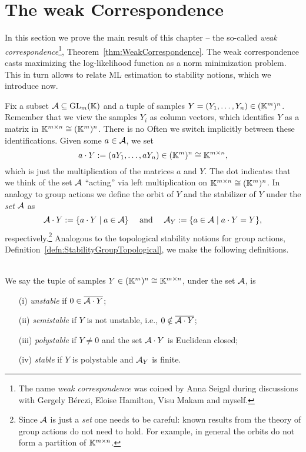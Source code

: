 
\section{The weak Correspondence}\label{sec:WeakCorrespondence}

In this section we prove the main result of this chapter -- the so-called \emph{weak correspondence}\footnote{The name \emph{weak correspondence} was coined by Anna Seigal during discussions with Gergely B\'erczi, Eloise Hamilton, Visu Makam and myself.}, Theorem~\ref{thm:WeakCorrespondence}. The weak correspondence casts maximizing the log-likelihood function as a norm minimization problem. This in turn allows to relate ML estimation to stability notions, which we introduce now.

Fix a subset $\mathcal{A} \subseteq \operatorname{GL}_m(\mathbb K)$ and a tuple of samples $Y = (Y_1, \ldots, Y_n) \in (\mathbb K^m)^n$. Remember that we view the samples $Y_i$ as column vectors, which identifies $Y$ as a matrix in $\mathbb K^{m \times n} \cong (\mathbb K^m)^n$. There is no Often we switch implicitly between these identifications. Given some $a \in \mathcal{A}$, we set
	\[ a \cdot Y := (aY_1, \ldots, aY_n) \in (\mathbb K^m)^n \cong \mathbb K^{m \times n} , \]
which is just the multiplication of the matrices $a$ and $Y$.
The dot indicates that we think of the set $\mathcal{A}$ ``acting'' via left multiplication on $\mathbb K^{m \times n} \cong (\mathbb K^m)^n$. In analogy to group actions we define the orbit of $Y$ and the stabilizer of $Y$ under the \emph{set} $\mathcal{A}$ as
	\begin{equation}\label{eq:defnOrbitStabilizerUnderA}
		\mathcal{A} \cdot Y := \{ a \cdot Y \mid a \in \mathcal{A} \} \quad \text{ and } \quad
		\mathcal{A}_Y := \{a \in \mathcal{A} \mid a \cdot Y = Y\},
	\end{equation}
respectively.\footnote{Since $\mathcal{A}$ is just a \emph{set} one needs to be careful: known results from the theory of group actions do not need to hold. For example, in general the orbits do not form a partition of $\mathbb K^{m \times n}$.} Analogous to the topological stability notions for group actions, Definition~\ref{defn:StabilityGroupTopological}, we make the following definitions.

\begin{defn} \label{defn:StabilitySets}
	\ \\
	We say the tuple of samples $Y \in (\mathbb K^m)^n \cong \mathbb K^{m \times n}$, under the set $\mathcal{A}$, is
	\begin{itemize}
		\item[(i)] \emph{unstable} if $0 \in \overline{\mathcal{A} \cdot Y}$;
		\item[(ii)] \emph{semistable} if $Y$ is not unstable, i.e., $0 \notin \overline{\mathcal{A} \cdot Y}$;
		\item[(iii)] \emph{polystable} if $Y \neq 0$ and the set $\mathcal{A} \cdot Y$ is Euclidean closed;
		\item[(iv)] \emph{stable} if $Y$ is polystable and $\mathcal{A}_Y$ is finite. \hfill{}
	\end{itemize}
\end{defn}

